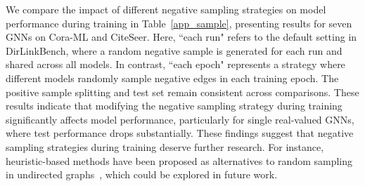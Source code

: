 We compare the impact of different negative sampling strategies on model performance during training in Table~\ref{app_sample}, presenting results for seven GNNs on Cora-ML and CiteSeer. Here, ``each run" refers to the default setting in DirLinkBench, where a random negative sample is generated for each run and shared across all models. In contrast, ``each epoch" represents a strategy where different models randomly sample negative edges in each training epoch. The positive sample splitting and test set remain consistent across comparisons. These results indicate that modifying the negative sampling strategy during training significantly affects model performance, particularly for single real-valued GNNs, where test performance drops substantially. These findings suggest that negative sampling strategies during training deserve further research. For instance, heuristic-based methods have been proposed as alternatives to random sampling in undirected graphs~\cite{li2023evaluating}, which could be explored in future work.


